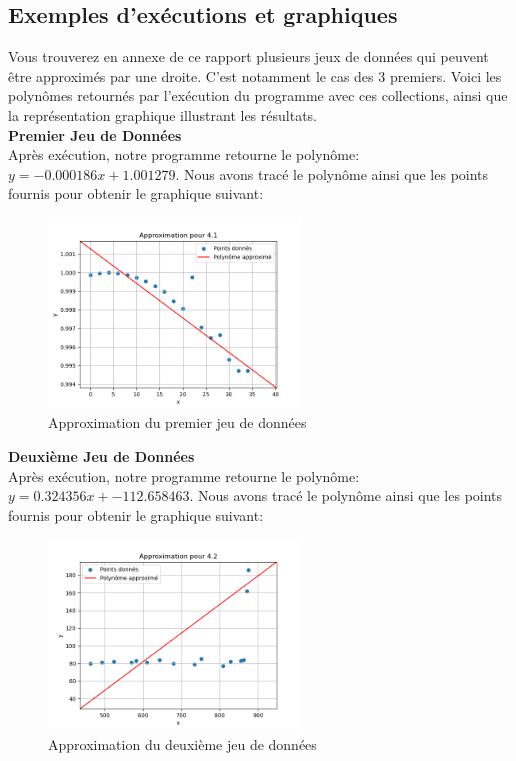 \subsection{Exemples d'exécutions et graphiques}
Vous trouverez en annexe de ce rapport plusieurs jeux de données qui peuvent être approximés par une droite. C'est notamment le cas des 3 premiers. Voici les polynômes retournés par l'exécution du programme avec ces collections, ainsi que la représentation graphique illustrant les résultats.\\
\textbf{Premier Jeu de Données}\\
Après exécution, notre programme retourne le polynôme: $y=-0.000186x+1.001279$. Nous avons tracé le polynôme ainsi que les points fournis pour obtenir le graphique suivant:\\
\begin{figure}[H]
    \centering
    \includegraphics[width=0.6\textwidth]{sources/Corentin/approximationC/results/graphs/41.png}
    \caption{Approximation du premier jeu de données}
\end{figure}
\textbf{Deuxième Jeu de Données}\\
Après exécution, notre programme retourne le polynôme: $y=0.324356x+-112.658463$. Nous avons tracé le polynôme ainsi que les points fournis pour obtenir le graphique suivant:\\
\begin{figure}[H]
    \centering
    \includegraphics[width=0.6\textwidth]{sources/Corentin/approximationC/results/graphs/42.png}
    \caption{Approximation du deuxième jeu de données}
\end{figure}
